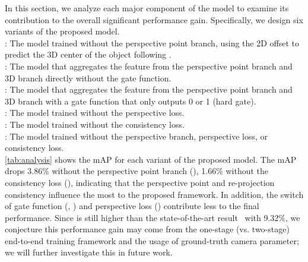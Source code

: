 \documentclass{article}
\begin{document}
In this section, we analyze each major component of the model to examine its contribution to the overall significant performance gain. Specifically, we design six variants of the proposed model.\\
 : The model trained without the perspective point branch, using the 2D offset to predict the 3D center of the object following \citet{huang2018cooperative}. \\
 : The model that aggregates the feature from the perspective point branch and 3D branch directly without the gate function. \\
 : The model that aggregates the feature from the perspective point branch and 3D branch with a gate function that only outputs 0 or 1 (hard gate). \\
 : The model trained without the perspective loss. \\
 : The model trained without the consistency loss. \\
 : The model trained without the perspective branch, perspective loss, or consistency loss.\\
\autoref{tab:analysis} shows the mAP for each variant of the proposed model. The mAP drops 3.86\% without the perspective point branch (), 1.66\% without the consistency loss (), indicating that the perspective point and re-projection consistency influence the most to the proposed framework. In addition, the switch of gate function (, ) and perspective loss () contribute less to the final performance. Since  is still higher than the state-of-the-art result~\cite{huang2018cooperative} with 9.32\%, we conjecture this performance gain may come from the one-stage (vs. two-stage) end-to-end training framework and the usage of ground-truth camera parameter; we will further investigate this in future work.

\begin{table}[b!]
    \caption{Ablative analysis of the proposed model on SUN RGB-D. We evaluate the mAP for 3D object detection.}
    \setlength{\tabcolsep}{16pt}
    \centering
    \label{tab:analysis}
\end{table}
\end{document}
